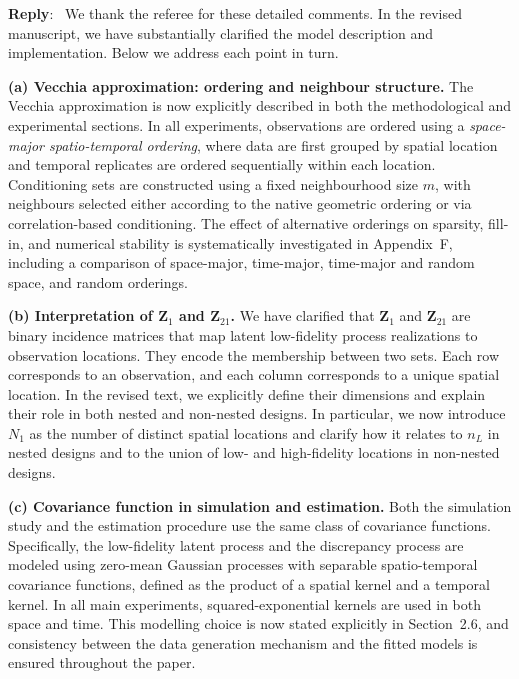 \documentclass[12pt]{article}
\newcommand{\0}{\mathbf{0}}
\newcounter{reviewer}
\newcounter{point}[reviewer]
\newenvironment{reply}
   {\medskip \noindent \begin{sf}\color{Blue}\textbf{Reply}:\  }
   {\medskip \end{sf}}
\begin{document}
\begin{reply}
    We thank the referee for these detailed comments. In the revised manuscript, we have 
substantially clarified the model description and implementation. Below we address 
each point in turn.

\medskip
\textbf{(a) Vecchia approximation: ordering and neighbour structure.}  
The Vecchia approximation is now explicitly described in both the methodological and 
experimental sections. In all experiments, observations are ordered using a 
\emph{space-major spatio-temporal ordering}, where data are first grouped by spatial 
location and temporal replicates are ordered sequentially within each location. 
Conditioning sets are constructed using a fixed neighbourhood size $m$, with neighbours 
selected either according to the native geometric ordering or via correlation-based 
conditioning. The effect of alternative orderings on sparsity, fill-in, and numerical 
stability is systematically investigated in Appendix~F, including a comparison of 
space-major, time-major, time-major and random space, and random orderings.

\medskip
\textbf{(b) Interpretation of $\mathbf{Z}_1$ and $\mathbf{Z}_{21}$.}  
We have clarified that $\mathbf{Z}_1$ and $\mathbf{Z}_{21}$ are binary incidence matrices 
that map latent low-fidelity process realizations to observation locations. They encode the membership  between two sets. Each row 
corresponds to an observation, and each column corresponds to a unique spatial location. 
In the revised text, we explicitly define their dimensions and explain their role in both 
nested and non-nested designs. In particular, we now introduce $N_1$ as the number of 
distinct spatial locations and clarify how it relates to $n_L$ in nested designs and to 
the union of low- and high-fidelity locations in non-nested designs.

\medskip
\textbf{(c) Covariance function in simulation and estimation.}  
Both the simulation study and the estimation procedure use the same class of covariance 
functions. Specifically, the low-fidelity latent process and the discrepancy process are 
modeled using zero-mean Gaussian processes with separable spatio-temporal covariance 
functions, defined as the product of a spatial kernel and a temporal kernel. In all main 
experiments, squared-exponential kernels are used in both space and time. This modelling 
choice is now stated explicitly in Section~2.6, and consistency between the data 
generation mechanism and the fitted models is ensured throughout the paper.


\end{reply}
\end{document}

